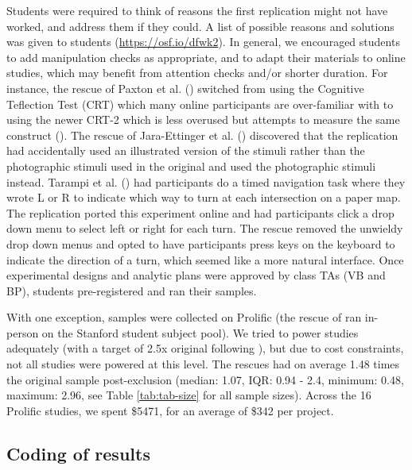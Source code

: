 \documentclass[
  english,
  a4paper,
]{article}
\begin{document}
Students were required to think of reasons the first replication might not have worked, and address them if they could.
A list of possible reasons and solutions was given to students (\url{https://osf.io/dfwk2}).
In general, we encouraged students to add manipulation checks as appropriate, and to adapt their materials to online studies, which may benefit from attention checks and/or shorter duration.
For instance, the rescue of Paxton et al. () switched from using the Cognitive Teflection Test (CRT) which many online participants are over-familiar with to using the newer CRT-2 which is less overused but attempts to measure the same construct ().
The rescue of Jara-Ettinger et al. () discovered that the replication had accidentally used an illustrated version of the stimuli rather than the photographic stimuli used in the original and used the photographic stimuli instead.
Tarampi et al. () had participants do a timed navigation task where they wrote L or R to indicate which way to turn at each intersection on a paper map.
The replication ported this experiment online and had participants click a drop down menu to select left or right for each turn.
The rescue removed the unwieldy drop down menus and opted to have participants press keys on the keyboard to indicate the direction of a turn, which seemed like a more natural interface.
Once experimental designs and analytic plans were approved by class TAs (VB and BP), students pre-registered and ran their samples.

With one exception, samples were collected on Prolific (the rescue of  ran in-person on the Stanford student subject pool).
We tried to power studies adequately (with a target of 2.5x original following ), but due to cost constraints, not all studies were powered at this level.
The rescues had on average 1.48 times the original sample post-exclusion (median: 1.07, IQR: 0.94 - 2.4, minimum: 0.48, maximum: 2.96, see Table \ref{tab:tab-size} for all sample sizes).
Across the 16 Prolific studies, we spent \$5471, for an average of \$342 per project.

\subsection{Coding of results}\label{coding-of-results}
\end{document}
